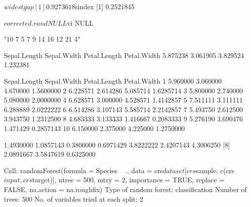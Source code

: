 \documentclass{article}
\begin{document}
\begin{Schunk}
\begin{Soutput}
$widestgap
[1] 0.9273618

$sindex
[1] 0.2521845

$corrected.rand
NULL

$vi
NULL
\end{Soutput}
\begin{Soutput}
[1] "10 7 5 7 9 14 16 12 21 4"
\end{Soutput}
\begin{Soutput}
Sepal.Length  Sepal.Width Petal.Length  Petal.Width 
    5.875238     3.061905     3.829524     1.232381 
\end{Soutput}
\begin{Soutput}
   Sepal.Length Sepal.Width Petal.Length Petal.Width
1      5.960000    3.060000     4.670000   1.5600000
2      6.228571    2.614286     5.085714   1.6285714
3      5.800000    2.740000     5.080000   2.0000000
4      6.628571    3.000000     4.528571   1.4142857
5      7.511111    3.111111     6.288889   2.0222222
6      6.514286    3.107143     5.585714   2.2142857
7      5.493750    2.612500     3.943750   1.2312500
8      4.683333    3.133333     1.416667   0.2083333
9      5.276190    3.690476     1.471429   0.2857143
10     6.150000    2.375000     4.225000   1.2750000
\end{Soutput}
\begin{Soutput}
 [1] 1.4930000 1.0857143 0.3800000 0.6971429 3.8222222 2.4207143 4.3006250
 [8] 2.0891667 3.5847619 0.6325000
\end{Soutput}
\begin{Soutput}
Call:
 randomForest(formula = Species ~ ., data = crs$dataset[crs$sample,      c(crs$input, crs$target)], ntree = 500, mtry = 2, importance = TRUE,      replace = FALSE, na.action = na.roughfix) 
               Type of random forest: classification
                     Number of trees: 500
No. of variables tried at each split: 2


\end{Soutput}
\end{Schunk}
\end{document}
